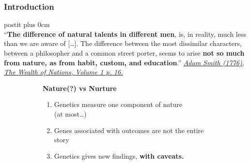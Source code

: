 \documentclass[dvipsnames,handout]{beamer} %
\renewcommand{\raggedright}{\leftskip=0pt \rightskip=0pt plus 0cm}
\begin{document}
\begin{frame}[noframenumbering]
    \frametitle{Introduction}
    \begin{beamercolorbox}{postit}
        \raggedright
        \vspace{0.01cm} \\
        ``\textbf{The difference of natural talents in different men}, is, in reality, much less than we are aware of [\ldots].
        The difference between the most dissimilar characters, between a philosopher and a common street porter, seems to arise \textbf{not so much from nature, as from habit, custom, and education}.''
        \hfill
        \underline{\textit{Adam Smith (1776), The Wealth of Nations, Volume 1 p. 16.}}
        \vspace{0.02cm}
    \end{beamercolorbox}
    \vspace{-0.25cm}
    \begin{figure}[h!]
        \centering
        \singlespacing
        \begin{subfigure}[c]{0.4\textwidth}
            \vspace{-0.25cm}

            \textbf{Nature(?) vs Nurture}
            \begin{enumerate}
                \item Genetics measure one component of nature \\(at most\dots)
                \item Genes associated with outcomes are not the entire story
                \item Genetics gives new findings, \textbf{with caveats.}
            \end{enumerate}
        \end{subfigure}
        \hfill
        \begin{subfigure}[c]{0.55\textwidth}
            \centering
        \end{subfigure}
    \end{figure}
\end{frame}
\end{document}
